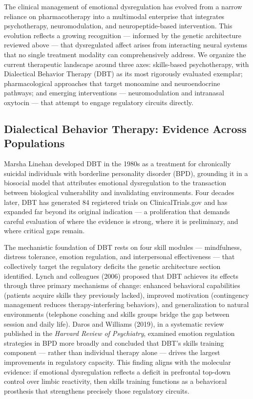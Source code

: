 

The clinical management of emotional dysregulation has evolved from a narrow
reliance on pharmacotherapy into a multimodal enterprise that integrates
psychotherapy, neuromodulation, and neuropeptide-based intervention.
This evolution reflects a growing recognition — informed by the genetic
architecture reviewed above — that dysregulated affect arises from
interacting neural systems that no single treatment modality can
comprehensively address.
We organize the current therapeutic landscape around three axes:
skills-based psychotherapy, with Dialectical Behavior Therapy (DBT) as its
most rigorously evaluated exemplar; pharmacological approaches that target
monoamine and neuroendocrine pathways; and emerging interventions —
neuromodulation and intranasal oxytocin — that attempt to engage regulatory
circuits directly.

\subsection*{Dialectical Behavior Therapy: Evidence Across Populations}

Marsha Linehan developed DBT in the 1980s as a treatment for chronically
suicidal individuals with borderline personality disorder (BPD), grounding it in
a biosocial model that attributes emotional dysregulation to the transaction
between biological vulnerability and invalidating environments.
Four decades later, DBT has generated 84 registered trials on
ClinicalTrials.gov and has expanded far beyond its original indication —
a proliferation that demands careful evaluation of where the evidence is
strong, where it is preliminary, and where critical gaps remain.

The mechanistic foundation of DBT rests on four skill modules — mindfulness,
distress tolerance, emotion regulation, and interpersonal effectiveness — that
collectively target the regulatory deficits the genetic architecture section
identified.
Lynch and colleagues (2006) proposed that DBT achieves its effects through
three primary mechanisms of change: enhanced behavioral capabilities (patients
acquire skills they previously lacked), improved motivation (contingency
management reduces therapy-interfering behaviors), and generalization to
natural environments (telephone coaching and skills groups bridge the gap
between session and daily life).
Daros and Williams (2019), in a systematic review published in the
\emph{Harvard Review of Psychiatry}, examined emotion regulation strategies
in BPD more broadly and concluded that DBT's skills training component — rather
than individual therapy alone — drives the largest improvements in regulatory
capacity.
This finding aligns with the molecular evidence: if emotional dysregulation
reflects a deficit in prefrontal top-down control over limbic reactivity,
then skills training functions as a behavioral prosthesis that strengthens
precisely those regulatory circuits.

